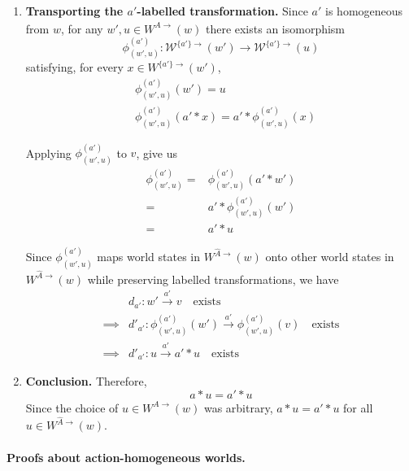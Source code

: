 \begin{proofE}
\begin{enumerate}
    \item \textbf{Transporting the $a'$-labelled transformation.}
    Since $a'$ is homogeneous from $w$, for any $w', u \in W^{\hat{A}\to}(w)$ there exists an isomorphism
    \begin{equation}
        \phi_{(w', u)}^{(a')}: \mathscr{W}^{\{a'\}\to}(w') \to \mathscr{W}^{\{a'\}\to}(u)
    \end{equation}
    satisfying, for every $x \in W^{\{a'\}\to}(w')$,
    \begin{align}
        & \phi_{(w', u)}^{(a')}(w') = u \\
        & \phi_{(w', u)}^{(a')}(a' \ast x) = a' \ast \phi_{(w', u)}^{(a')}(x)
    \end{align}

    Applying $\phi^{(a')}_{(w', u)}$ to $v$, give us
    \begin{align}
        \phi^{(a')}_{(w', u)} = & \phi^{(a')}_{(w', u)}(a' \ast w') \\
        = & a' \ast \phi^{(a')}_{(w', u)}(w') \\
        = & a' \ast u
    \end{align}

    Since $\phi^{(a')}_{(w', u)}$ maps world states in $W^{\hat{A}\to}(w)$ onto other world states in $W^{\hat{A}\to}(w)$ while preserving labelled transformations, we have
    \begin{align}
        & d_{a'}: w' \xrightarrow{a'} v \quad \text{exists} \\
        \implies & d'_{a'}: \phi^{(a')}_{(w', u)}(w') \xrightarrow{a'} \phi^{(a')}_{(w', u)}(v) \quad \text{exists} \\
        \implies & d'_{a'}: u \xrightarrow{a'} a' \ast u \quad \text{exists}
    \end{align}

    \item \textbf{Conclusion.}
    Therefore,
    \begin{equation}
        a \ast u = a' \ast u
    \end{equation}
    Since the choice of $u \in W^{\hat{A}\to}(w)$ was arbitrary, $a \ast u = a' \ast u$ for all $u \in W^{\hat{A}\to}(w)$.
\end{enumerate}
\end{proofE}






\paragraph{Proofs about action-homogeneous worlds.}

